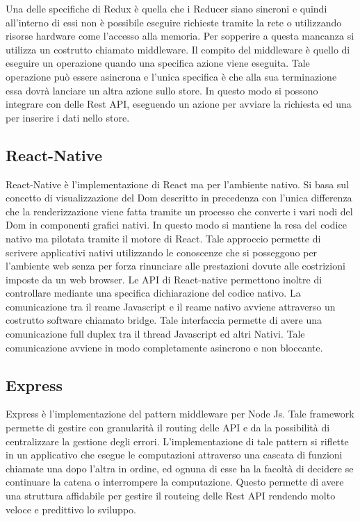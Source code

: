 	Una delle specifiche di Redux è quella che i Reducer siano sincroni e quindi all'interno di essi non è possibile eseguire richieste tramite la rete o utilizzando risorse hardware come l'accesso alla memoria. Per sopperire a questa mancanza si utilizza un costrutto chiamato middleware. Il compito del middleware è quello di eseguire un operazione quando una specifica azione viene eseguita. Tale operazione può essere asincrona e l'unica specifica è che alla sua terminazione essa dovrà lanciare un altra azione sullo store. In questo modo si possono integrare con delle Rest API, eseguendo un azione per avviare la richiesta ed una per inserire i dati nello store.
	
\subsection{React-Native}\vspace{5mm}

	React-Native è l'implementazione di React ma per l’ambiente nativo. Si basa sul concetto di visualizzazione del Dom descritto in precedenza con l'unica differenza che la renderizzazione viene fatta tramite un processo che converte i vari nodi del Dom in componenti grafici nativi. In questo modo si mantiene la resa del codice nativo ma pilotata tramite il motore di React. Tale approccio permette di scrivere applicativi nativi utilizzando le conoscenze che si posseggono per l'ambiente web senza per forza rinunciare alle prestazioni dovute alle costrizioni imposte da un web browser. Le API di React-native permettono inoltre di controllare mediante una specifica dichiarazione del codice nativo. La comunicazione tra il reame Javascript e il reame nativo avviene attraverso un costrutto software chiamato bridge. Tale interfaccia permette di avere una comunicazione full duplex tra il thread Javascript ed altri Nativi. Tale comunicazione avviene in modo completamente asincrono e non bloccante.\vspace{5mm}

\subsection{Express}\vspace{5mm}

	Express è l'implementazione del pattern middleware per Node Js. Tale framework permette di gestire con granularità il routing delle API e da la possibilità di centralizzare la gestione degli errori. L'implementazione di tale pattern si riflette in un applicativo che esegue le computazioni attraverso una cascata di funzioni chiamate una dopo l'altra in ordine, ed ognuna di esse ha la facoltà di decidere se continuare la catena o interrompere la computazione. Questo permette di avere una struttura affidabile per gestire il routeing delle Rest API rendendo molto veloce e predittivo lo sviluppo.\vspace{5mm}

